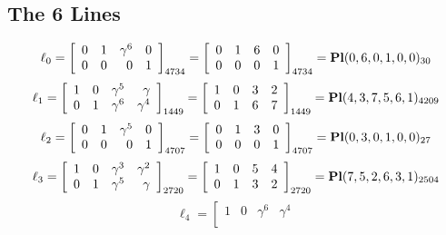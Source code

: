 \documentclass{article}
\begin{document}
{\subsection*{The 6 Lines}
$$
\ell_{0} = 
\left[
\begin{array}{*{4}{r}}
0 & 1 & \gamma^{6} & 0\\
0 & 0 & 0 & 1\\
\end{array}
\right]
_{4734}
=
\left[
\begin{array}{*{4}c}
0  & 1  & 6  & 0\\
0  & 0  & 0  & 1\\
\end{array}
\right]_{4734}
={\rm\bf Pl}(0,6,0,1,0,0 )_{30}$$
$$
\ell_{1} = 
\left[
\begin{array}{*{4}{r}}
1 & 0 & \gamma^{5} & \gamma \\
0 & 1 & \gamma^{6} & \gamma^{4}\\
\end{array}
\right]
_{1449}
=
\left[
\begin{array}{*{4}c}
1  & 0  & 3  & 2\\
0  & 1  & 6  & 7\\
\end{array}
\right]_{1449}
={\rm\bf Pl}(4,3,7,5,6,1 )_{4209}$$
$$
\ell_{2} = 
\left[
\begin{array}{*{4}{r}}
0 & 1 & \gamma^{5} & 0\\
0 & 0 & 0 & 1\\
\end{array}
\right]
_{4707}
=
\left[
\begin{array}{*{4}c}
0  & 1  & 3  & 0\\
0  & 0  & 0  & 1\\
\end{array}
\right]_{4707}
={\rm\bf Pl}(0,3,0,1,0,0 )_{27}$$
$$
\ell_{3} = 
\left[
\begin{array}{*{4}{r}}
1 & 0 & \gamma^{3} & \gamma^{2}\\
0 & 1 & \gamma^{5} & \gamma \\
\end{array}
\right]
_{2720}
=
\left[
\begin{array}{*{4}c}
1  & 0  & 5  & 4\\
0  & 1  & 3  & 2\\
\end{array}
\right]_{2720}
={\rm\bf Pl}(7,5,2,6,3,1 )_{2504}$$
$$
\ell_{4} = 
\left[
\begin{array}{*{4}{r}}
1 & 0 & \gamma^{6} & \gamma^{4}\\

\end{array}$$}
\end{document}
